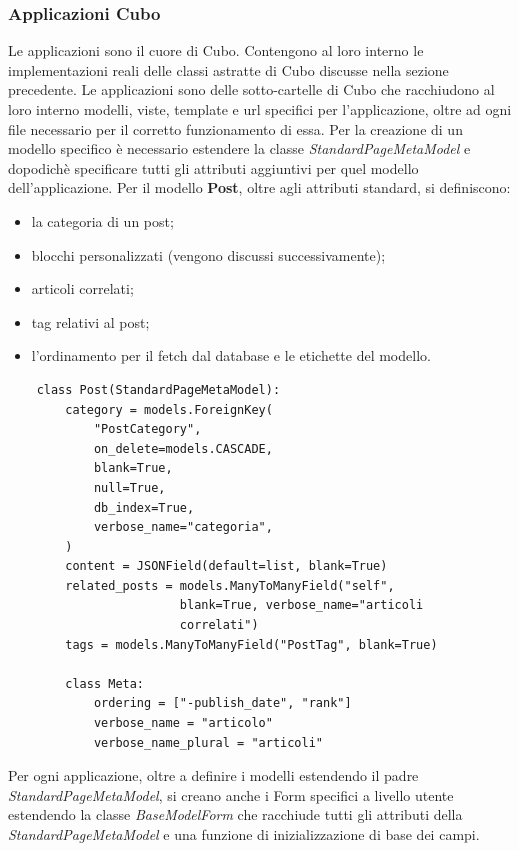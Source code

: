 \documentclass[12pt,a4paper]{article}
\begin{document}
\subsubsection{Applicazioni Cubo}
Le applicazioni sono il cuore di Cubo. Contengono al loro interno le implementazioni reali delle classi astratte di Cubo discusse nella sezione precedente. Le applicazioni sono delle sotto-cartelle di Cubo che racchiudono al loro interno modelli, viste, template e url specifici per l'applicazione, oltre ad ogni file necessario per il corretto funzionamento di essa. Per la creazione di un modello specifico è necessario estendere la classe \textit{StandardPageMetaModel} e dopodichè specificare tutti gli attributi aggiuntivi per quel modello dell'applicazione. Per il modello \textbf{Post}, oltre agli attributi standard, si definiscono:
\begin{itemize}
    \item la categoria di un post;
    \item blocchi personalizzati (vengono discussi successivamente);
    \item articoli correlati;
    \item tag relativi al post;
    \item l'ordinamento per il fetch dal database e le etichette del modello.
\end{itemize}


\begin{verbatim}
    class Post(StandardPageMetaModel):
        category = models.ForeignKey(
            "PostCategory",
            on_delete=models.CASCADE,
            blank=True,
            null=True,
            db_index=True,
            verbose_name="categoria",
        )
        content = JSONField(default=list, blank=True)
        related_posts = models.ManyToManyField("self",
                        blank=True, verbose_name="articoli
                        correlati")
        tags = models.ManyToManyField("PostTag", blank=True)

        class Meta:
            ordering = ["-publish_date", "rank"]
            verbose_name = "articolo"
            verbose_name_plural = "articoli"
\end{verbatim}
Per ogni applicazione, oltre a definire i modelli estendendo il padre \textit{StandardPageMetaModel}, si creano anche i Form specifici a livello utente estendendo la classe \textit{BaseModelForm} che racchiude tutti gli attributi della \textit{StandardPageMetaModel} e una funzione di inizializzazione di base dei campi.
\end{document}
